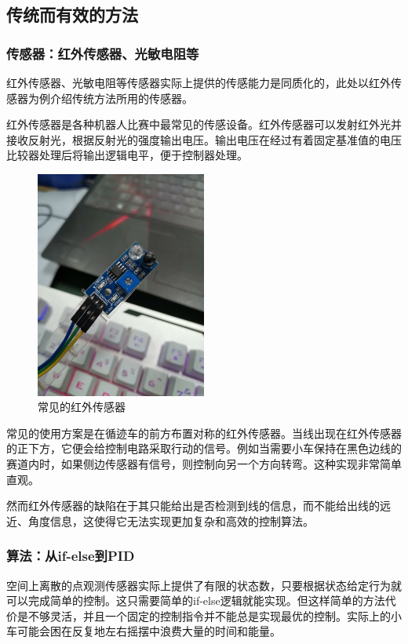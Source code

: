 \documentclass{paper}
\begin{document}
\subsection{传统而有效的方法\cite{intro2023robot}}
\label{subsec:label}
\subsubsection{传感器：红外传感器、光敏电阻等}
\label{subsec:label}
红外传感器、光敏电阻等传感器实际上提供的传感能力是同质化的，此处以红外传感器为例介绍传统方法所用的传感器。

红外传感器是各种机器人比赛中最常见的传感设备。红外传感器可以发射红外光并接收反射光，根据反射光的强度输出电压。输出电压在经过有着固定基准值的电压比较器处理后将输出逻辑电平，便于控制器处理。
\begin{figure}[ht]
  \centering
  \includegraphics[width=0.5\textwidth]{figures/sensor.jpg}
  \caption{ 常见的红外传感器}
\end{figure}

常见的使用方案是在循迹车的前方布置对称的红外传感器。当线出现在红外传感器的正下方，它便会给控制电路采取行动的信号。例如当需要小车保持在黑色边线的赛道内时，如果侧边传感器有信号，则控制向另一个方向转弯。这种实现非常简单直观。

然而红外传感器的缺陷在于其只能给出是否检测到线的信息，而不能给出线的远近、角度信息，这使得它无法实现更加复杂和高效的控制算法。
\subsubsection{算法：从if-else到PID}
\label{subsec:label}
空间上离散的点观测传感器实际上提供了有限的状态数，只要根据状态给定行为就可以完成简单的控制。这只需要简单的if-else逻辑就能实现。但这样简单的方法代价是不够灵活，并且一个固定的控制指令并不能总是实现最优的控制。实际上的小车可能会困在反复地左右摇摆中浪费大量的时间和能量。
\end{document}
